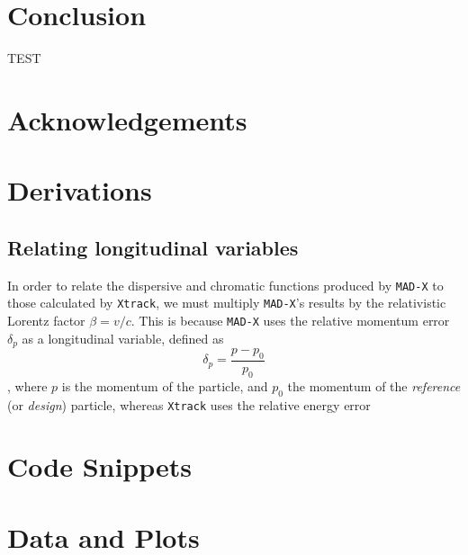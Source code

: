 \documentclass[11pt]{report}
\begin{document}
\chapter{Conclusion}


TEST
\chapter{Acknowledgements}

 
 

\begin{appendices}

\chapter{Derivations}

\section{Relating longitudinal variables}

In order to relate the dispersive and chromatic functions produced by \verb|MAD-X| to those calculated by \verb|Xtrack|, we must multiply \verb|MAD-X|'s results by the relativistic Lorentz factor $\beta=v/c$. This is because \verb|MAD-X| uses the relative momentum error $\delta_p$ as a longitudinal variable, defined as
\begin{equation}
\delta_p=\frac{p-p_0}{p_0}
\end{equation}, where $p$ is the momentum of the particle, and $p_0$ the momentum of the {\it reference} (or {\it design}) particle, whereas \verb|Xtrack| uses the relative energy error

\chapter{Code Snippets}

\chapter{Data and Plots}

\end{appendices}
\end{document}
